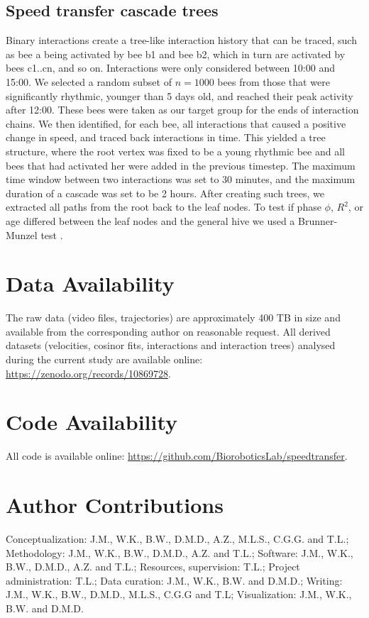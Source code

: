 \documentclass{article}
\begin{document}
\subsection*{Speed transfer cascade trees}
Binary interactions create a tree-like interaction history that can be traced, such as bee a being activated by bee b1 and bee b2, which in turn are activated by bees c1..cn, and so on. Interactions were only considered between 10:00 and 15:00. We selected a random subset of $n = 1000$ bees from those that were significantly rhythmic, younger than 5 days old, and reached their peak activity after 12:00. These bees were taken as our target group for the ends of interaction chains. We then identified, for each bee, all interactions that caused a positive change in speed, and traced back interactions in time. This yielded a tree structure, where the root vertex was fixed to be a young rhythmic bee and all bees that had activated her were added in the previous timestep. The maximum time window between two interactions was set to 30 minutes, and the maximum duration of a cascade was set to be 2 hours. After creating such trees, we extracted all paths from the root back to the leaf nodes. To test if phase $\phi$, $R^2$, or age differed between the leaf nodes and the general hive we used a Brunner-Munzel test \cite{brunner_nonparametric_2000}.

\newpage

\section{Data Availability}
The raw data (video files, trajectories) are approximately 400 TB in size and available from the corresponding author on reasonable request.
All derived datasets (velocities, cosinor fits, interactions and interaction trees) analysed during the current study are available online: \url{https://zenodo.org/records/10869728}.
\section{Code Availability}
All code is available online: \url{https://github.com/BioroboticsLab/speedtransfer}.

\section{Author Contributions}
Conceptualization: J.M., W.K., B.W., D.M.D., A.Z., M.L.S., C.G.G. and T.L.;
Methodology: J.M., W.K., B.W., D.M.D., A.Z. and T.L.; 
Software: J.M., W.K., B.W., D.M.D., A.Z. and T.L.; 
Resources, supervision: T.L.;  
Project administration: T.L.;  
Data curation: J.M., W.K., B.W. and D.M.D.;  
Writing: J.M., W.K., B.W., D.M.D., M.L.S., C.G.G and T.L; 
Visualization: J.M., W.K., B.W. and D.M.D.
\end{document}

